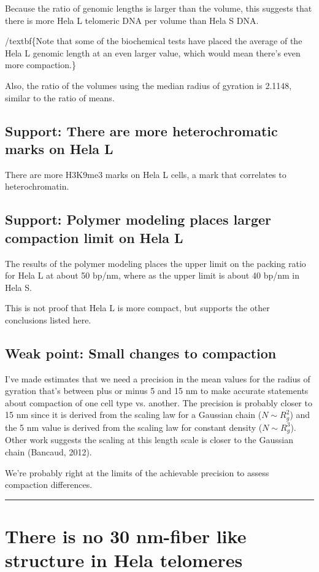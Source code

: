 \documentclass[12pt, a4paper]{article}
\begin{document}
Because the ratio of genomic lengths is larger than the volume, this
suggests that there is more Hela L telomeric DNA per volume than Hela
S DNA.

/textbf\{Note that some of the biochemical tests have placed the
average of the Hela L genomic length at an even larger value, which
would mean there's even more compaction.\}

Also, the ratio of the volumes using the median radius of gyration
is 2.1148, similar to the ratio of means.

\subsection{Support: There are more heterochromatic marks on Hela L}
\label{sec-2-2}
There are more H3K9me3 marks on Hela L cells, a mark that
correlates to heterochromatin.

\subsection{Support: Polymer modeling places larger compaction limit on Hela L}
\label{sec-2-3}
The results of the polymer modeling places the upper limit on the
packing ratio for Hela L at about 50 bp/nm, where as the upper
limit is about 40 bp/nm in Hela S.

This is not proof that Hela L is more compact, but supports the
other conclusions listed here.

\subsection{Weak point: Small changes to compaction}
\label{sec-2-4}
I've made estimates that we need a precision in the mean values for
the radius of gyration that's between plus or minus 5 and 15 nm to
make accurate statements about compaction of one cell type
vs. another. The precision is probably closer to 15 nm since it is
derived from the scaling law for a Gaussian chain ($N \sim R_g^2$)
and the 5 nm value is derived from the scaling law for constant
density ($N \sim R_g^3$). Other work suggests the scaling at this
length scale is closer to the Gaussian chain (Bancaud, 2012).

We're probably right at the limits of the achievable precision to
assess compaction differences.

\rule{\linewidth}{0.5pt}
\section{There is no 30 nm-fiber like structure in Hela telomeres}
\label{sec-3}
\end{document}
